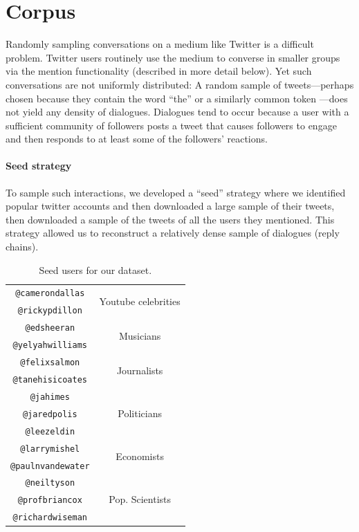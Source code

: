 \documentclass[11pt,letterpaper]{article}
\begin{document}
\section{Corpus}

Randomly sampling conversations on a medium like Twitter is a difficult problem. Twitter users routinely use the medium to converse in smaller groups via the \@ mention functionality (described in more detail below). Yet such conversations are not uniformly distributed: A random sample of tweets---perhaps chosen because they contain the word ``the'' or a similarly common token \cite{doyle2014}---does not yield any density of dialogues. Dialogues tend to occur because a user with a sufficient community of followers posts a tweet that causes followers to engage and then responds to at least some of the followers' reactions. 

\paragraph{Seed strategy}

To sample such interactions, we developed a ``seed'' strategy where we identified popular twitter accounts and then downloaded a large sample of their tweets, then downloaded a sample of the tweets of all the users they mentioned. This strategy allowed us to reconstruct a relatively dense sample of dialogues (reply chains).

\begin{table}
\begin{center}
\begin{tabular}{|c|c|}
\hline
{\tt @camerondallas} & \multirow{2}{*}{Youtube celebrities} \\
{\tt @rickypdillon} & \\
\hline
{\tt @edsheeran} & \multirow{2}{*}{Musicians} \\
{\tt @yelyahwilliams} & \\
\hline
{\tt @felixsalmon} & \multirow{2}{*}{Journalists} \\
{\tt @tanehisicoates} & \\
\hline
{\tt @jahimes} & \multirow{3}{*}{Politicians} \\
{\tt @jaredpolis} & \\
{\tt @leezeldin} & \\
\hline
{\tt @larrymishel} & \multirow{2}{*}{Economists} \\
{\tt @paulnvandewater} & \\
\hline
{\tt @neiltyson} & \multirow{3}{*}{Pop. Scientists} \\
{\tt @profbriancox} & \\
{\tt @richardwiseman} & \\
\hline
\end{tabular}
\end{center}
\caption{\label{tab:seed-users} Seed users for our dataset.}
\end{table}
\end{document}
